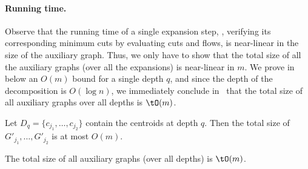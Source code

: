 \paragraph{Running time.}
Observe that the running time of a single expansion step,
\ie, verifying its corresponding minimum cuts by evaluating cuts and flows,
is near-linear in the size of the auxiliary graph.
Thus, we only have to show that the total size of all the auxiliary graphs
(over all the expansions) is near-linear in $m$.
We prove in  below an $O(m)$ bound for a single depth $q$,
and since the depth of the decomposition is $O(\log n)$,
we immediately conclude in~
that the total size of all auxiliary graphs over all depths is $\tO(m)$.

\begin{lemma}\label{lemma:size}
Let $D_q=\{c_{j_1},\dots,c_{j_2}\}$ contain the centroids at depth $q$.
Then the total size of $G'_{j_1},\dots,G'_{j_2}$ is at most $O(m)$.
\end{lemma}

\begin{corollary}\label{cor:total}
The total size of all auxiliary graphs
(over all depths) is $\tO(m)$.
\end{corollary}

